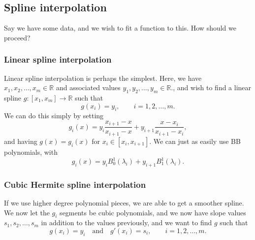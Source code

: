 \subsection{Spline interpolation}
Say we have some data, and we wish to fit a function to this.
How should we proceed?

\subsubsection{Linear spline interpolation}
Linear spline interpolation is perhaps the simplest.
Here, we have $x_1, x_2, \dots, x_m \in \mathbb{R}$ and associated values $y_1, y_2, \dots, y_m \in \mathbb{R}$., and wish to find a linear spline $g : [x_1, x_m] \to \mathbb{R}$ such that
\begin{equation}
    g(x_i) = y_i, \qquad i = 1, 2, \dots, m.
\end{equation}
We can do this simply by setting
\begin{equation}
    g_i(x) = y_i \frac{x_{i + 1} - x}{x_{i + 1} - x} + y_{i + 1} \frac{x - x_i}{x_{i + 1} - x_i},
\end{equation}
and having $g(x) = g_i(x)$ for $x_i \in [x_i, x_{i + 1}]$.
We can just as easily use BB polynomials, with
\begin{equation}
    g_i(x) = y_i B_0^1(\lambda_i) + y_{i + 1} B_1^1(\lambda_i).
\end{equation}

\subsubsection{Cubic Hermite spline interpolation}
If we use higher degree polynomial pieces, we are able to get a smoother spline.
We now let the $g_i$ segments be cubic polynomials, and we now have slope values $s_1, s_2, \dots, s_m$ in addition to the values previously, and we want to find $g$ such that
\begin{equation}
    g(x_i) = y_i
    \quad\text{and}\quad
    g'(x_i) = s_i,
    \qquad i = 1, 2, \dots, m.
\end{equation}